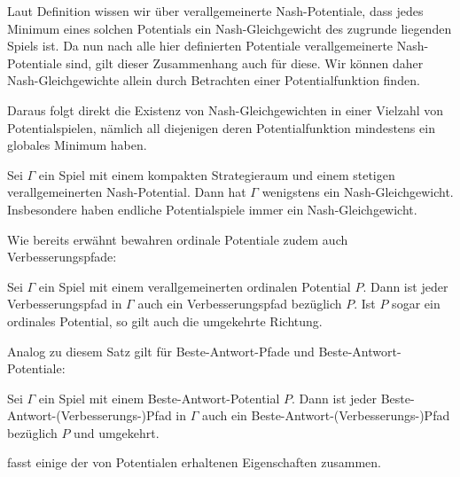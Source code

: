 Laut Definition wissen wir über verallgemeinerte Nash-Potentiale, dass jedes Minimum eines solchen Potentials ein Nash-Gleichgewicht des zugrunde liegenden Spiels ist. Da nun nach  alle hier definierten Potentiale verallgemeinerte Nash-Potentiale sind, gilt dieser Zusammenhang auch für diese. Wir können daher Nash-Gleichgewichte allein durch Betrachten einer Potentialfunktion finden. 

Daraus folgt direkt die Existenz von Nash-Gleichgewichten in einer Vielzahl von Potentialspielen, nämlich all diejenigen deren Potentialfunktion mindestens ein globales Minimum haben. 

\begin{kor}
	Sei $\Gamma$ ein Spiel mit einem kompakten Strategieraum und einem stetigen verallgemeinerten Nash-Potential. Dann hat $\Gamma$ wenigstens ein Nash-Gleichgewicht. Insbesondere haben endliche Potentialspiele immer ein Nash-Gleichgewicht.
\end{kor}

Wie bereits erwähnt bewahren ordinale Potentiale zudem auch Verbesserungspfade:

\begin{satz}\label{prop:ordPotVerbpfad}
	Sei $\Gamma$ ein Spiel mit einem verallgemeinerten ordinalen Potential $P$. Dann ist jeder Verbesserungspfad in $\Gamma$ auch ein Verbesserungspfad bezüglich $P$. Ist $P$ sogar ein ordinales Potential, so gilt auch die umgekehrte Richtung.
\end{satz}

Analog zu diesem Satz gilt für Beste-Antwort-Pfade und Beste-Antwort-Potentiale:

\begin{satz}\label{prop:BAPotBAPfad}
	Sei $\Gamma$ ein Spiel mit einem Beste-Antwort-Potential $P$. Dann ist jeder Beste-Antwort-(Verbesserungs-)Pfad in $\Gamma$ auch ein Beste-Antwort-(Verbesserungs-)Pfad bezüglich $P$ und umgekehrt.
\end{satz}

 fasst einige der von Potentialen erhaltenen Eigenschaften zusammen.

